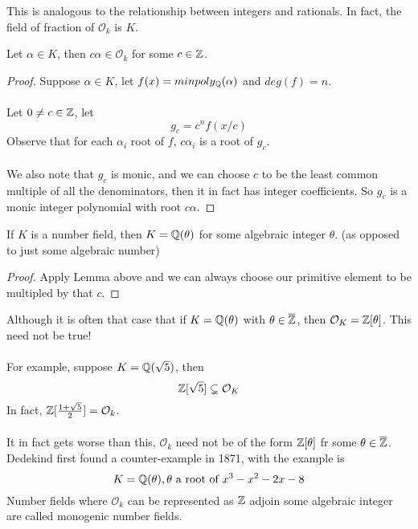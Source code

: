 \begin{remark}
This is analogous to the relationship between integers and rationals. In fact, the field of fraction of $\mathcal{O}_k$ is $K$.
\end{remark}

\begin{lemma}
Let $\alpha \in K$, then $c\alpha \in \mathcal{O}_k$ for some $c \in \mathbb{Z}$.
\end{lemma}

\begin{proof}
Suppose $\alpha \in K$, let $f(x) = minpoly_{\mathbb{Q}}(\alpha)$ and $deg(f) = n$.\\\\
Let $0 \neq c \in \mathbb{Z}$, let
\[g_c = c^n f(x/c)\]
Observe that for each $\alpha_i$ root of $f$, $c\alpha_i$ is a root of $g_c$.\\\\
We also note that $g_c$ is monic, and we can choose $c$ to be the least common multiple of all the denominators, then it in fact has integer coefficients. So $g_c$ is a monic integer polynomial with root $c \alpha$.
\end{proof}

\begin{corollary}
If $K$ is a number field, then $K = \mathbb{Q}(\theta)$ for some algebraic integer $\theta$. (as opposed to just some algebraic number)
\end{corollary}

\begin{proof}
Apply Lemma above and we can always choose our primitive element to be multipled by that $c$.
\end{proof}

\begin{remark}[WARNINGS! (46 - 47)]
Although it is often that case that if $K = \mathbb{Q}(\theta)$ with $\theta \in \overline{\mathbb{Z}}$, then $\mathcal{O}_K = \mathbb{Z}[\theta]$. This need not be true!\\\\
For example, suppose $K = \mathbb{Q}(\sqrt{5})$, then
\[\mathbb{Z}[\sqrt{5}] \subsetneq \mathcal{O}_K\]
In fact, $\mathbb{Z}[\frac{1 + \sqrt{5}}{2}] = \mathcal{O}_k$.\\\\
It in fact gets worse than this, $\mathcal{O}_k$ need not be of the form $\mathbb{Z}[\theta]$ fr some $\theta \in \overline{\mathbb{Z}}$. Dedekind first found a counter-example in 1871, with the example is
\[K = \mathbb{Q}(\theta), \theta \text{ a root of } x^3 - x^2 - 2x - 8\]
Number fields where $\mathcal{O}_k$ can be represented as $\mathbb{Z}$ adjoin some algebraic integer are called monogenic number fields.
\end{remark}